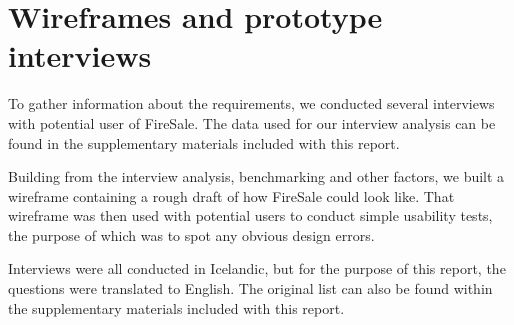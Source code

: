 \section{Wireframes and prototype interviews}
To gather information about the requirements, we conducted several interviews with potential user of FireSale. The data used for our interview analysis can be found in the supplementary materials included with this report.

Building from the interview analysis, benchmarking and other factors, we built a wireframe containing a rough draft of how FireSale could look like. That wireframe was then used with potential users to conduct simple usability tests, the purpose of which was to spot any obvious design errors. 

Interviews were all conducted in Icelandic, but for the purpose of this report, the questions were translated to English. The original list can also be found within the supplementary materials included with this report.
